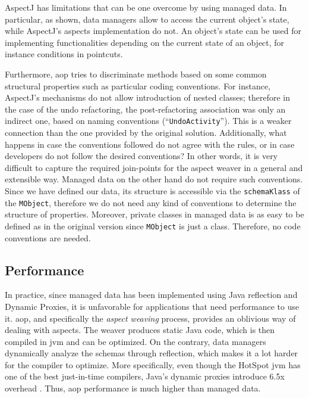 AspectJ has limitations that can be one overcome by using managed data.
In particular, as shown, data managers allow to access the current object's state, while AspectJ's aspects implementation do not.
An object's state can be used for implementing functionalities depending on the current state of an object, for instance conditions in pointcuts.

Furthermore, \ac{aop} tries to discriminate methods based on some common structural properties such as particular coding conventions.
For instance, AspectJ's mechanisms do not allow introduction of nested classes; therefore in the case of the undo refactoring, the post-refactoring association was only an indirect one, based on naming conventions (``\texttt{UndoActivity}'').
This is a weaker connection than the one provided by the original solution.  
Additionally, what happens in case the conventions followed do not agree with the rules, or in case developers do not follow the desired conventions?
In other words, it is very difficult to capture the required join-points for the aspect weaver in a general and extensible way.
Managed data on the other hand do not require such conventions.
Since we have defined our data, its structure is accessible via the \texttt{schemaKlass} of the \texttt{MObject}, therefore we do not need any kind of conventions to determine the structure of properties.
Moreover, private classes in managed data is as easy to be defined as in the original version since \texttt{MObject} is just a class.
Therefore, no code conventions are needed.

\subsection{Performance}
In practice, since managed data has been implemented using Java reflection and Dynamic Proxies, it is unfavorable for applications that need performance to use it.
\ac{aop}, and specifically the \textit{aspect weaving} process, provides an oblivious way of dealing with aspects.
The weaver produces static Java code, which is then compiled in \ac{jvm} and can be optimized.
On the contrary, data managers dynamically analyze the schemas through reflection, which makes it a lot harder for the compiler to optimize. 
More specifically, even though the HotSpot \ac{jvm} has one of the best just-in-time compilers, Java's dynamic proxies introduce 6.5x overhead \cite{marr2015zero}.
Thus, \ac{aop} performance is much higher than managed data.

